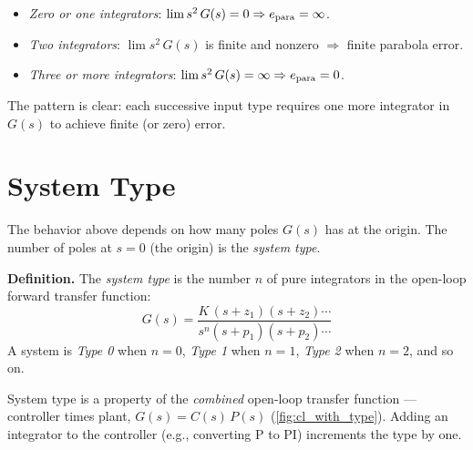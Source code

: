 \documentclass[12pt]{article}
\begin{document}
\begin{itemize}
  \item \emph{Zero or one integrators}: $\lim s^2\,G(s) = 0 \Rightarrow
    e_{\rm para} = \infty$.
  \item \emph{Two integrators}: $\lim s^2\,G(s)$ is finite and nonzero
    $\Rightarrow$ finite parabola error.
  \item \emph{Three or more integrators}: $\lim s^2\,G(s) = \infty \Rightarrow
    e_{\rm para} = 0$.
\end{itemize}

The pattern is clear: each successive input type requires one more integrator in
$G(s)$ to achieve finite (or zero) error.

\section{System Type}
\label{sec:system_type}

The behavior above depends on how many poles $G(s)$ has at the
origin.  The number of poles at $s = 0$ (the origin) is the \emph{system type}.

\textbf{Definition.}  The \emph{system type} is the number $n$ of pure
integrators in the open-loop forward transfer function:
\begin{equation}
  G(s) = \frac{K\,(s + z_1)(s + z_2)\cdots}{s^n(s + p_1)(s + p_2)\cdots}
  \label{eq:G_form}
\end{equation}
A system is \emph{Type 0} when $n = 0$, \emph{Type 1} when $n = 1$,
\emph{Type 2} when $n = 2$, and so on.

System type is a property of the \emph{combined} open-loop transfer function ---
controller times plant, $G(s) = C(s)\,P(s)$ (\cref{fig:cl_with_type}).  Adding
an integrator to the controller (e.g., converting P to PI) increments the type
by one.
\end{document}
